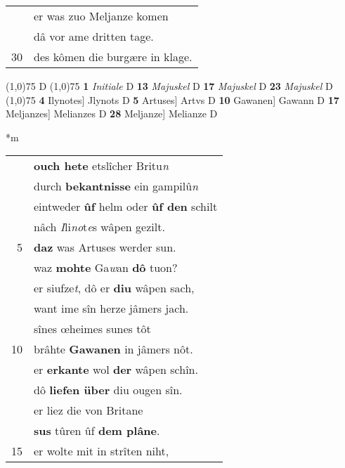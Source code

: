 \documentclass[8pt,a4paper,notitlepage]{article}
\begin{document}
\begin{table}[ht]
\begin{minipage}[t]{0.5\linewidth}
\begin{tabular}{rl}
 & er was zuo Meljanze komen\\ 
 & dâ vor ame dritten tage.\\ 
30 & des kômen die burgære in klage.\\ 
\end{tabular}
\scriptsize
\line(1,0){75} \newline
D \newline
\line(1,0){75} \newline
\textbf{1} \textit{Initiale} D  \textbf{13} \textit{Majuskel} D  \textbf{17} \textit{Majuskel} D  \textbf{23} \textit{Majuskel} D  \newline
\line(1,0){75} \newline
\textbf{4} Ilynotes] Jlynots D \textbf{5} Artuses] Artvs D \textbf{10} Gawanen] Gawann D \textbf{17} Meljanzes] Melianzes D \textbf{28} Meljanze] Melianze D \newline
\end{minipage}
\hspace{0.5cm}
\begin{minipage}[t]{0.5\linewidth}
\small
\begin{center}*m
\end{center}
\begin{tabular}{rl}
 & \textbf{ouch hete} etslîcher Britu\textit{n}\\ 
 & durch \textbf{bekantnisse} ein gampilû\textit{n}\\ 
 & eintweder \textbf{ûf} helm oder \textbf{ûf den} schilt\\ 
 & nâch \textit{I}li\textit{no}t\textit{e}s  wâpen gezilt.\\ 
5 & \textbf{daz} was Artuses werder sun.\\ 
 & waz \textbf{mohte} Ga\textit{w}an \textbf{dô} tuon?\\ 
 & er siufze\textit{t}, dô er \textbf{diu} wâpen sach,\\ 
 & want ime sîn herze jâmers jach.\\ 
 & sînes œheimes sunes tôt\\ 
10 & brâhte \textbf{Gawanen} in jâmers nôt.\\ 
 & er \textbf{erkante} wol \textbf{der} wâpen schîn.\\ 
 & dô \textbf{liefen über} diu ougen sîn.\\ 
 & er liez die von Britane\\ 
 & \textbf{sus} tûren ûf \textbf{dem plâne}.\\ 
15 & er wolte mit in strîten niht,\\ 

\end{tabular}
\end{minipage}
\end{table}
\end{document}

